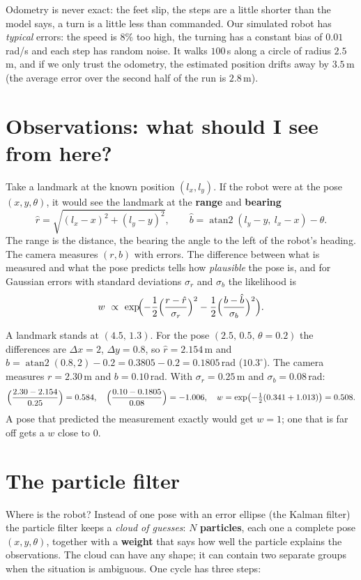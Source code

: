 Odometry is never exact: the feet slip, the steps are a little shorter than the model says, a turn is a little less than commanded. Our simulated robot has \emph{typical} errors: the speed is $8\%$ too high, the turning has a constant bias of $0.01$\,rad/s and each step has random noise. It walks $100$\,s along a circle of radius $2.5$\,m, and if we only trust the odometry, the estimated position drifts away by $3.5$\,m (the average error over the second half of the run is $2.8$\,m).

\section*{Observations: what should I see from here?}
Take a landmark at the known position $(l_x,l_y)$. If the robot were at the pose $(x,y,\theta)$, it would see the landmark at the \textbf{range} and \textbf{bearing}
\[
\hat r=\sqrt{(l_x-x)^2+(l_y-y)^2},\qquad
\hat b=\operatorname{atan2}(l_y-y,\ l_x-x)-\theta .
\]
The range is the distance, the bearing the angle to the left of the robot's heading. The camera measures $(r,b)$ with errors. The difference between what is measured and what the pose predicts tells how \emph{plausible} the pose is, and for Gaussian errors with standard deviations $\sigma_r$ and $\sigma_b$ the likelihood is
\[
w\ \propto\ \exp\!\Bigl(-\frac12\Bigl(\frac{r-\hat r}{\sigma_r}\Bigr)^{2}-\frac12\Bigl(\frac{b-\hat b}{\sigma_b}\Bigr)^{2}\Bigr).
\]

\begin{example}
A landmark stands at $(4.5,\,1.3)$. For the pose $(2.5,\,0.5,\,\theta=0.2)$ the differences are $\Delta x=2$, $\Delta y=0.8$, so $\hat r=2.154$\,m and $\hat b=\operatorname{atan2}(0.8,2)-0.2=0.3805-0.2=0.1805$\,rad ($10.3^{\circ}$). The camera measures $r=2.30$\,m and $b=0.10$\,rad. With $\sigma_r=0.25$\,m and $\sigma_b=0.08$\,rad:
\[
\Bigl(\frac{2.30-2.154}{0.25}\Bigr)=0.584,\quad \Bigl(\frac{0.10-0.1805}{0.08}\Bigr)=-1.006,\quad
w=\exp\bigl(-\tfrac12(0.341+1.013)\bigr)=0.508 .
\]
A pose that predicted the measurement exactly would get $w=1$; one that is far off gets a $w$ close to $0$.
\end{example}

\section*{The particle filter}
Where is the robot? Instead of one pose with an error ellipse (the Kalman filter) the particle filter keeps a \emph{cloud of guesses}: $N$ \textbf{particles}, each one a complete pose $(x,y,\theta)$, together with a \textbf{weight} that says how well the particle explains the observations. The cloud can have any shape; it can contain two separate groups when the situation is ambiguous. One cycle has three steps:


